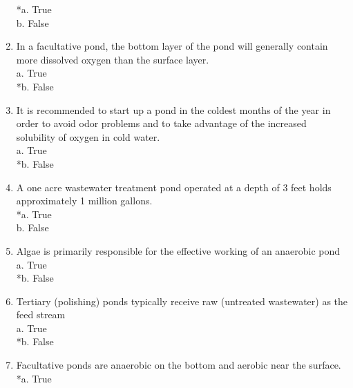 \begin{enumerate}
*a. True \\

b. False \\


\item  In a facultative pond, the bottom layer of the pond will generally contain more dissolved oxygen than the surface layer.\\


a. True \\

*b. False \\


\item  It is recommended to start up a pond in the coldest months of the year in order to avoid odor problems and to take advantage of the increased solubility of oxygen in cold water.\\


a. True \\

*b. False \\


\item  A one acre wastewater treatment pond operated at a depth of 3 feet holds approximately 1 million gallons.\\


*a. True \\

b. False \\


\item  Algae is primarily responsible for the effective working of an anaerobic pond\\


a. True \\

*b. False \\


\item  Tertiary (polishing) ponds typically receive raw (untreated wastewater) as the feed stream\\


a. True \\

*b. False \\


\item  Facultative ponds are anaerobic on the bottom and aerobic near the surface.\\


*a. True \\


\end{enumerate}
